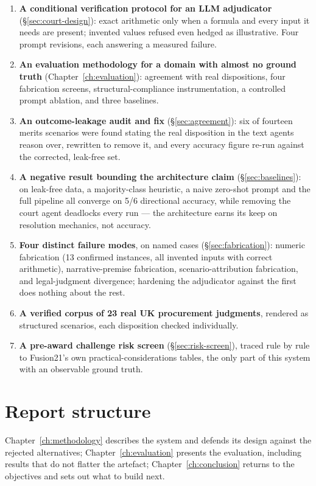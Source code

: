 \begin{enumerate}
 \item \textbf{A conditional verification protocol for an LLM adjudicator}
 (\S\ref{sec:court-design}): exact arithmetic only when a formula and every
 input it needs are present; invented values refused even hedged as
 illustrative. Four prompt revisions, each answering a measured failure.
 \item \textbf{An evaluation methodology for a domain with almost no ground
 truth} (Chapter~\ref{ch:evaluation}): agreement with real dispositions, four
 fabrication screens, structural-compliance instrumentation, a controlled
 prompt ablation, and three baselines.
 \item \textbf{An outcome-leakage audit and fix} (\S\ref{sec:agreement}): six
 of fourteen merits scenarios were found stating the real disposition in the
 text agents reason over, rewritten to remove it, and every accuracy figure
 re-run against the corrected, leak-free set.
 \item \textbf{A negative result bounding the architecture claim}
 (\S\ref{sec:baselines}): on leak-free data, a majority-class heuristic, a
 naive zero-shot prompt and the full pipeline all converge on 5/6 directional
 accuracy, while removing the court agent deadlocks every run --- the
 architecture earns its keep on resolution mechanics, not accuracy.
 \item \textbf{Four distinct failure modes}, on named cases
 (\S\ref{sec:fabrication}): numeric fabrication (13 confirmed instances, all
 invented inputs with correct arithmetic), narrative-premise fabrication,
 scenario-attribution fabrication, and legal-judgment divergence; hardening
 the adjudicator against the first does nothing about the rest.
 \item \textbf{A verified corpus of 23 real UK procurement judgments}, rendered as
 structured scenarios, each disposition checked individually.
 \item \textbf{A pre-award challenge risk screen} (\S\ref{sec:risk-screen}), traced
 rule by rule to Fusion21's own practical-considerations tables, the only
 part of this system with an observable ground truth.
\end{enumerate}

\section{Report structure}

Chapter~\ref{ch:methodology} describes the system and defends its design
against the rejected alternatives; Chapter~\ref{ch:evaluation} presents
the evaluation, including results that do not flatter the artefact;
Chapter~\ref{ch:conclusion} returns to the objectives and sets out what to
build next.